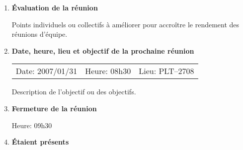 \documentclass[12pt]{ULojpv}
\begin{document}
\begin{enumerate}
\begin{enumerate}
\end{enumerate}


\item \textbf{Évaluation de la réunion}

Points individuels ou collectifs à améliorer pour accroître le rendement des réunions d'équipe.


\item \textbf{Date, heure, lieu et objectif de la prochaine réunion}

\begin{tabular}{@{}lll}
   Date: 2007/01/31
   & Heure: 08h30
   &  Lieu: PLT--2708
\end{tabular}
\par
Description de l'objectif ou des objectifs.


\item \textbf{Fermeture de la réunion}

Heure: 09h30


\item \textbf{Étaient présents}


\end{enumerate}
\end{document}
